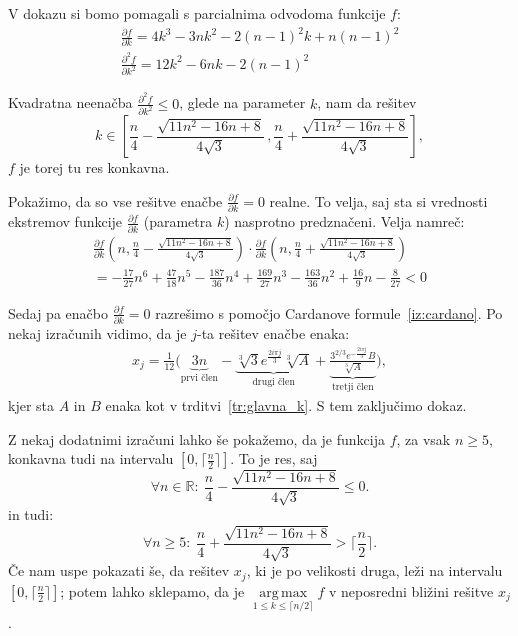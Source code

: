 \documentclass[fin1, tisk]{fmfdelo}
\newcommand{\R}{\mathbb R}
\newcommand{\argmax}{\mathop{\mathrm{arg\,max}}\limits}
\begin{document}
\begin{dokaz}
  V dokazu si bomo pomagali s parcialnima odvodoma funkcije $f$:
\begin{gather}
\frac{\partial f}{\partial k} = 4k^3 - 3nk^2 - 2(n-1)^2k + n(n-1)^2\label{al:f1}\\
\frac{\partial^2 f}{\partial k^2} = 12k^2 - 6nk - 2(n-1)^2\label{al:f2}
\end{gather}

Kvadratna neenačba $\frac{\partial^2 f}{\partial k^2} \leq 0$, glede na parameter $k$,
nam da rešitev 
\begin{equation}
k \in \left[\frac{n}{4} - \frac{\sqrt{11n^2 - 16n +8}}{4\sqrt{3}}\,,
\frac{n}{4} + \frac{\sqrt{11n^2 - 16n +8}}{4\sqrt{3}}\right],\label{eq:interval_konkavnosti}
\end{equation}
$f$ je torej tu res konkavna.

Pokažimo, da so vse rešitve enačbe  $\frac{\partial f}{\partial k} = 0$
realne. To velja, saj sta si vrednosti ekstremov funkcije $\frac{\partial f}{\partial k}$ 
(parametra $k$) nasprotno predznačeni. Velja namreč:
\begin{align*}
\frac{\partial f}{\partial k}(n, \frac{n}{4} - \frac{\sqrt{11n^2 - 16n +8}}{4\sqrt{3}})\cdot 
\frac{\partial f}{\partial k}(n, \frac{n}{4} + \frac{\sqrt{11n^2 - 16n +8}}{4\sqrt{3}}) \\
= -\frac{17}{27} n^6 + \frac{47}{18} n^5 - \frac{187}{36} n^4 + \frac{169}{27} n^3 - \frac{163}{36} n^2 + \frac{16}{9} n - \frac{8}{27}
< 0
\end{align*}

Sedaj pa enačbo $\frac{\partial f}{\partial k} = 0$ razrešimo s pomočjo Cardanove 
formule~\ref{iz:cardano}. Po nekaj izračunih vidimo, 
da je $j$-ta rešitev enačbe enaka:
\begin{align*}
x_j = \frac{1}{12} \Big( \underbrace{3 n}_{\text{prvi člen}}  -
\underbrace{\sqrt[3]{3} e^{\frac{2 i \pi j}{3}} \sqrt[3]{A}}_{\text{drugi člen}} +
\underbrace{\frac{3^{2/3} e^{-\frac{2 i \pi j}{3}} B}{\sqrt[3]{A}}}_{\text{tretji člen}} 
 \Big),
\end{align*}
kjer sta $A$ in $B$ enaka kot v trditvi~\ref{tr:glavna_k}.
S tem zaključimo dokaz.

\end{dokaz}

Z nekaj dodatnimi izračuni lahko še pokažemo, da je funkcija $f$, za vsak 
$n \geq 5$, konkavna tudi na intervalu 
$[0, \lceil\frac{n}{2}\rceil]$. To je res, saj 
\[
\forall n \in \R:\ \frac{n}{4} - \frac{\sqrt{11n^2 - 16n +8}}{4\sqrt{3}} \leq 0.
\]
in tudi:
\[
\forall n \geq 5:\ \frac{n}{4} + \frac{\sqrt{11n^2 - 16n +8}}{4\sqrt{3}} > \lceil\frac{n}{2}\rceil.
\]
Če nam uspe pokazati še, da rešitev $x_j$, ki je po velikosti druga, leži 
na intervalu $[0, \lceil\frac{n}{2}\rceil]$; potem lahko sklepamo, da je 
$\argmax_{1 \leq k \leq \lceil n/2\rceil} f$ v neposredni bližini rešitve $x_j$.
\end{document}
